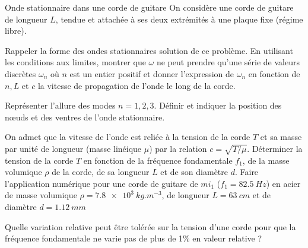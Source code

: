 \begin{exo}[PCSI]{Onde stationnaire dans une corde de guitare}
On considère une corde de guitare de longueur $L$, tendue et attachée à ses deux extrémités à une plaque fixe (régime libre).
\begin{quest}
\item Rappeler la forme des ondes stationnaires solution de ce problème. En utilisant les conditions aux limites, montrer que $\omega$ ne peut prendre qu'une série de valeurs discrètes $\omega_n$ où $n$ est un entier positif et donner l'expression de $\omega_n$ en fonction de $n,L$ et $c$ la vitesse de propagation de l'onde le long de la corde.
\item Représenter l'allure des modes $n=1,2,3$. Définir et indiquer la position des nœuds et des ventres de l'onde stationnaire.
\item On admet que la vitesse de l'onde est reliée à la tension de la corde $T$ et sa masse par unité de longueur (masse linéique $\mu$) par la relation $c=\sqrt{T/\mu}$. Déterminer la tension de la corde $T$ en fonction de la fréquence fondamentale $f_1$, de la masse volumique $\rho$ de la corde, de sa longueur $L$ et de son diamètre $d$. Faire l'application numérique pour une corde de guitare de $mi_1$ ($f_1=\SI{82,5}{Hz}$) en acier de masse volumique $\rho=\SI{7,8e3}{kg.m^{-3}}$, de longueur $L=\SI{63}{cm}$ et de diamètre $d=\SI{1,12}{mm}$
\item Quelle variation relative peut être tolérée sur la tension d'une corde pour que la fréquence fondamentale ne varie pas de plus de 1\% en valeur relative ?
\end{quest}
\end{exo}

